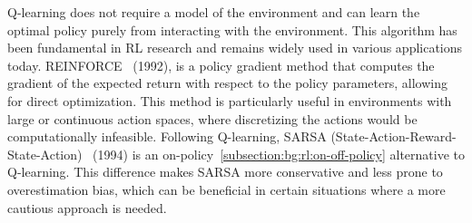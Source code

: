 Q-learning does not require a model of the environment and can learn the optimal policy purely from interacting
with the environment.
This algorithm has been fundamental in RL research and remains widely used in various applications today.
%
REINFORCE~\citep{williams1992simple} (1992), is a policy gradient method that computes the gradient of the expected
return with respect to the policy parameters, allowing for direct optimization.
This method is particularly useful in environments with large or continuous action spaces, where discretizing the
actions would be computationally infeasible.
%
Following Q-learning, SARSA (State-Action-Reward-State-Action)~\citep{rummery1994line} (1994) is an
on-policy~\ref{subsection:bg:rl:on-off-policy} alternative to Q-learning.
This difference makes SARSA more conservative and less prone to overestimation bias, which can be beneficial in
certain situations where a more cautious approach is needed.

